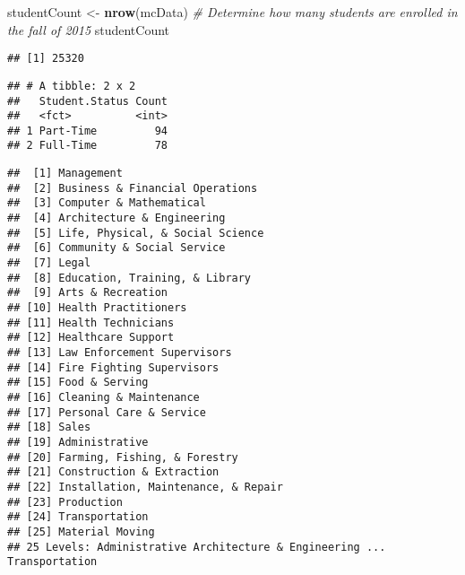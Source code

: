 \documentclass[]{article}
\newenvironment{Shaded}{\begin{snugshade}}{\end{snugshade}}
\newcommand{\KeywordTok}[1]{\textcolor[rgb]{0.13,0.29,0.53}{\textbf{#1}}}
\newcommand{\DataTypeTok}[1]{\textcolor[rgb]{0.13,0.29,0.53}{#1}}
\newcommand{\StringTok}[1]{\textcolor[rgb]{0.31,0.60,0.02}{#1}}
\newcommand{\CommentTok}[1]{\textcolor[rgb]{0.56,0.35,0.01}{\textit{#1}}}
\newcommand{\OperatorTok}[1]{\textcolor[rgb]{0.81,0.36,0.00}{\textbf{#1}}}
\newcommand{\NormalTok}[1]{#1}
\begin{document}
\begin{Shaded}
\begin{Highlighting}[]
\NormalTok{studentCount <-}\StringTok{ }\KeywordTok{nrow}\NormalTok{(mcData) }\CommentTok{# Determine how many students are enrolled in the fall of 2015}
\NormalTok{studentCount}
\end{Highlighting}
\end{Shaded}

\begin{verbatim}
## [1] 25320
\end{verbatim}

\begin{Shaded}
\end{Shaded}

\begin{verbatim}
## # A tibble: 2 x 2
##   Student.Status Count
##   <fct>          <int>
## 1 Part-Time         94
## 2 Full-Time         78
\end{verbatim}

\begin{Shaded}
\end{Shaded}

\begin{verbatim}
##  [1] Management                         
##  [2] Business & Financial Operations    
##  [3] Computer & Mathematical            
##  [4] Architecture & Engineering         
##  [5] Life, Physical, & Social Science   
##  [6] Community & Social Service         
##  [7] Legal                              
##  [8] Education, Training, & Library     
##  [9] Arts & Recreation                  
## [10] Health Practitioners               
## [11] Health Technicians                 
## [12] Healthcare Support                 
## [13] Law Enforcement Supervisors        
## [14] Fire Fighting Supervisors          
## [15] Food & Serving                     
## [16] Cleaning & Maintenance             
## [17] Personal Care & Service            
## [18] Sales                              
## [19] Administrative                     
## [20] Farming, Fishing, & Forestry       
## [21] Construction & Extraction          
## [22] Installation, Maintenance, & Repair
## [23] Production                         
## [24] Transportation                     
## [25] Material Moving                    
## 25 Levels: Administrative Architecture & Engineering ... Transportation
\end{verbatim}
\end{document}
